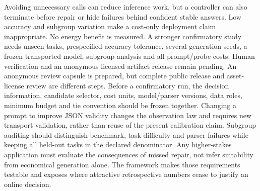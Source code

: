\documentclass{article}
\begin{document}
Avoiding unnecessary calls can reduce inference work, but a controller can
also terminate before repair or hide failures behind confident stable answers.
Low accuracy and subgroup variation make a cost-only deployment claim
inappropriate. No energy benefit is measured. A stronger confirmatory study
needs unseen tasks, prespecified accuracy tolerance, several generation seeds,
a frozen transported model, subgroup analysis and all prompt/probe costs.
Human verification and an anonymous licensed artifact release remain pending.
An anonymous review capsule is prepared, but complete public release and
asset-license review are different steps. Before a confirmatory run, the
decision information, candidate selector, cost units, model/parser versions,
data roles, minimum budget and tie convention should be frozen together.
Changing a prompt to improve JSON validity changes the observation law and
requires new transport validation, rather than reuse of the present calibration
claim. Subgroup auditing should distinguish benchmark, task difficulty and
parser failures while keeping all held-out tasks in the declared denominator.
Any higher-stakes application must evaluate the consequences of missed repair,
not infer suitability from economical generation alone.
The framework makes those requirements testable and exposes where attractive
retrospective numbers cease to justify an online decision.

\label{sec:main-text-end}
\clearpage

\clearpage
\appendix

\clearpage

\end{document}
